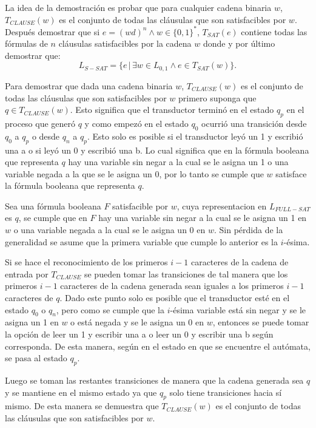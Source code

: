 La idea de la demostración es probar que para cualquier cadena binaria $w$, $T_{CLAUSE}(w)$ es el conjunto de
todas las cláusulas que son satisfacibles por $w$. Después demostrar que si $e=(wd)^n \wedge w\in\{0,1\}^*$, $T_{SAT}(e)$ contiene todas
las fórmulas de $n$ cláusulas satisfacibles por la cadena $w$ donde  y por último demostrar que:
$$L_{S-SAT} = \{e\,|\,\exists w \in L_{0,1} \wedge e \in T_{SAT}(w) \}.$$

Para demostrar que dada una cadena binaria $w$, $T_{CLAUSE}(w)$ es el conjunto de todas las
cláusulas que son satisfacibles por $w$ primero suponga que $q\in T_{CLAUSE}(w)$.
Esto significa que el transductor terminó en el estado $q_p$ en el proceso que generó $q$ y como empezó
en el estado $q_0$ ocurrió una transición desde $q_0$ a $q_p$ o desde $q_n$ a $q_p$. Esto solo es posible
si el transductor leyó un 1 y escribió una a o si leyó un 0 y escribió una b. Lo cual significa que en la fórmula booleana que representa $q$
hay una variable sin negar a la cual se le asigna un 1 o una variable negada a la
que se le asigna un 0, por lo tanto se cumple que $w$ satisface la fórmula booleana que representa $q$.

Sea una fórmula booleana $F$ satisfacible por $w$, cuya representacion en $L_{FULL-SAT}$ es $q$,  se cumple que
en $F$ hay una variable sin negar a la cual se le asigna un 1 en $w$
o una variable negada a la cual se le asigna un 0 en $w$. Sin pérdida de la generalidad se asume que la primera variable que cumple lo anterior es la $i$-ésima.

Si se hace el reconocimiento de los primeros $i-1$ caracteres de la cadena de entrada por $T_{CLAUSE}$ se pueden
tomar las transiciones de tal manera que los primeros $i-1$ caracteres de la cadena generada sean iguales a los primeros $i-1$ caracteres de $q$.
Dado este punto solo es posible que el transductor esté en el estado $q_0$ o $q_n$, pero como se cumple que la
$i$-ésima variable está sin negar y se le asigna un 1 en $w$ o está negada y se le asigna un 0 en $w$, entonces se puede
tomar la opción de leer un 1 y escribir una a o leer un 0 y escribir una b según corresponda.
De esta manera, según en el estado en que se encuentre el autómata, se pasa al estado $q_p$.

Luego se toman las restantes transiciones de manera que la cadena generada sea $q$ y se mantiene en el mismo
estado ya que $q_p$ solo tiene transiciones hacia sí mismo. De esta manera se demuestra que $T_{CLAUSE}(w)$
es el conjunto de todas las cláusulas que son satisfacibles por $w$.

